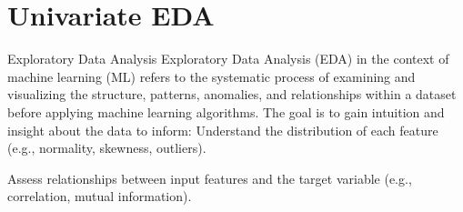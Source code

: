 \documentclass[aspectratio=169]{beamer}
\begin{document}
\section{Univariate EDA}
\label{sec:orgecb0fa2}
\begin{frame}[label={sec:orgc0eb3a7}]{Exploratory Data Analysis}
Exploratory Data Analysis (EDA) in the context of machine learning
(ML) refers to the systematic process of examining and visualizing the
structure, patterns, anomalies, and relationships within a dataset
before applying machine learning algorithms. The goal is to gain
intuition and insight about the data to inform: Understand the
distribution of each feature (e.g., normality, skewness, outliers).

Assess relationships between input features and the target variable
(e.g., correlation, mutual information).
\end{frame}
\end{document}
